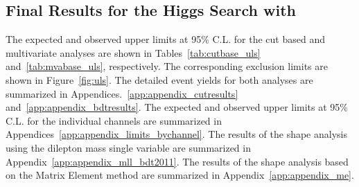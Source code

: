 \clearpage
\subsection{Final Results for the Higgs Search with \intlumiEightTeV{}}
\label{sec:search_results}

The expected and observed upper limits at 95\% C.L. for the cut based and
multivariate analyses are shown in Tables~\ref{tab:cutbase_uls}
and~\ref{tab:mvabase_uls}, respectively. The corresponding exclusion
limits are shown in Figure~\ref{fig:uls}. The detailed event yields 
for both analyses are summarized in Appendices.~\ref{app:appendix_cutresults} 
and~\ref{app:appendix_bdtresults}. 
The expected and observed upper limits at 95\% C.L. for the individual channels 
are summarized in Appendices~\ref{app:appendix_limits_bychannel}. 
The results of the shape analysis using the dilepton mass single variable are 
summarized in Appendix~\ref{app:appendix_mll_bdt2011}.
The results of the shape analysis based on the Matrix Element method 
are summarized in Appendix~\ref{app:appendix_me}. 


